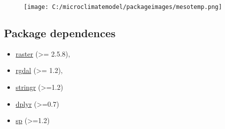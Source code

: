 \documentclass[]{article}
\providecommand{\tightlist}{%
  \setlength{\itemsep}{0pt}\setlength{\parskip}{0pt}}
\begin{document}
\begin{figure}
\centering
\texttt{[image: C:/microclimatemodel/packageimages/mesotemp.png]}
\caption{}
\end{figure}

\subsection{Package dependences}\label{package-dependences}

\begin{itemize}
\tightlist
\item
  \href{https://cran.r-project.org/web/packages/raster/}{raster}
  (\textgreater{}= 2.5.8),
\item
  \href{https://cran.r-project.org/web/packages/rgdal/}{rgdal}
  (\textgreater{}= 1.2),
\item
  \href{https://cran.r-project.org/web/packages/stringr/}{stringr}
  (\textgreater{}=1.2)
\item
  \href{https://cran.r-project.org/web/packages/dplyr/}{dplyr}
  (\textgreater{}=0.7)
\item
  \href{https://cran.r-project.org/web/packages/sp/}{sp}
  (\textgreater{}=1.2)
\end{itemize}
\end{document}
